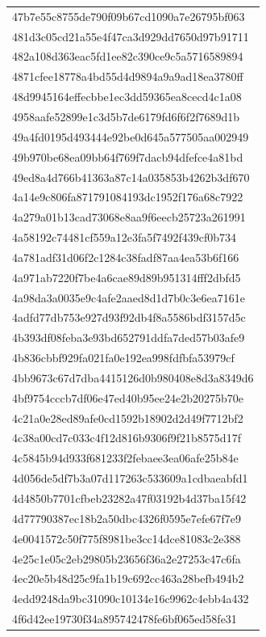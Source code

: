 \begin{tabular}{l}
47b7e55c8755de790f09b67cd1090a7e26795bf063 \\
481d3c05cd21a55e4f47ca3d929dd7650d97b91711 \\
482a108d363eac5fd1ee82c390ce9c5a5716589894 \\
4871cfee18778a4bd55d4d9894a9a9ad18ea3780ff \\
48d9945164effecbbe1ec3dd59365ea8cecd4c1a08 \\
4958aafe52899e1c3d5b7de6179fd6f6f2f7689d1b \\
49a4fd0195d493444e92be0d645a577505aa002949 \\
49b970be68ea09bb64f769f7dacb94dfefce4a81bd \\
49ed8a4d766b41363a87c14a035853b4262b3df670 \\
4a14e9c806fa871791084193dc1952f176a68c7922 \\
4a279a01b13cad73068e8aa9f6eecb25723a261991 \\
4a58192c74481cf559a12e3fa5f7492f439cf0b734 \\
4a781adf31d06f2c1284c38fadf87aa4ea53b6f166 \\
4a971ab7220f7be4a6cae89d89b951314fff2dbfd5 \\
4a98da3a0035e9c4afe2aaed8d1d7b0c3e6ea7161e \\
4adfd77db753e927d93f92db4f8a5586bdf3157d5c \\
4b393df08feba3e93bd652791ddfa7ded57b03afe9 \\
4b836cbbf929fa021fa0e192ea998fdfbfa53979cf \\
4bb9673c67d7dba4415126d0b980408e8d3a8349d6 \\
4bf9754cccb7df06e47ed40b95ee24e2b20275b70e \\
4c21a0e28ed89afe0cd1592b18902d2d49f7712bf2 \\
4c38a00cd7c033c4f12d816b9306f9f21b8575d17f \\
4c5845b94d933f681233f2febaee3ea06afe25b84e \\
4d056de5df7b3a07d117263c533609a1cdbaeabfd1 \\
4d4850b7701cfbeb23282a47f03192b4d37ba15f42 \\
4d77790387ec18b2a50dbc4326f0595e7efe67f7e9 \\
4e0041572c50f775f8981be3cc14dce81083c2e388 \\
4e25c1e05c2eb29805b23656f36a2e27253c47c6fa \\
4ec20e5b48d25c9fa1b19c692cc463a28befb494b2 \\
4edd9248da9bc31090c10134e16c9962c4ebb4a432 \\
4f6d42ee19730f34a895742478fe6bf065ed58fe31 \\

\end{tabular}

